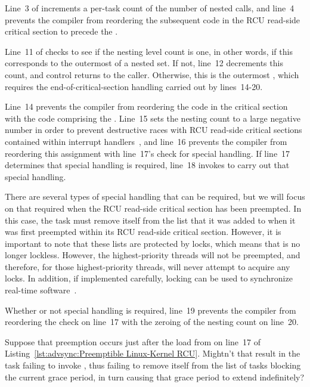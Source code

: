 Line~3 of  increments a per-task count of the
number of nested  calls, and
line~4 prevents the compiler from reordering the subsequent code in the
RCU read-side critical section to precede the .

Line~11 of  checks to see if the nesting level count
is one, in other words, if this corresponds to the outermost
 of a nested set.
If not, line~12 decrements this count, and control returns to the caller.
Otherwise, this is the outermost , which requires
the end-of-critical-section handling carried out by lines~14-20.

Line~14 prevents the compiler from reordering the code in the critical
section with the code comprising the .
Line~15 sets the nesting count to a large negative number in order to prevent
destructive races with RCU read-side critical sections contained within
interrupt handlers~\cite{PaulEMcKenney2011RCU3.0trainwreck},
and line~16 prevents the compiler from reordering this assignment with
line~17's check for special handling.
If line~17 determines that special handling is required, line~18
invokes  to carry out that special handling.

There are several types of special handling that can be required, but
we will focus on that required when the RCU read-side critical section
has been preempted.
In this case, the task must remove itself from the list that it was
added to when it was first preempted within its
RCU read-side critical section.
However, it is important to note that these lists are protected by locks,
which means that  is no longer lockless.
However, the highest-priority threads will not be preempted, and therefore,
for those highest-priority threads,  will never
attempt to acquire any locks.
In addition, if implemented carefully, locking can be used to synchronize
real-time software~\cite{BjoernBrandenburgPhD}.

Whether or not special handling is required, line~19 prevents the compiler
from reordering the check on line~17 with the zeroing of the nesting
count on line~20.

\QuickQuiz{}
	Suppose that preemption occurs just after the load from
	 on line~17 of
	Listing~\ref{lst:advsync:Preemptible Linux-Kernel RCU}.
	Mightn't that result in the task failing to invoke
	, thus failing to remove itself
	from the list of tasks blocking the current grace period,
	in turn causing that grace period to extend indefinitely?
 \QuickQuizEnd

